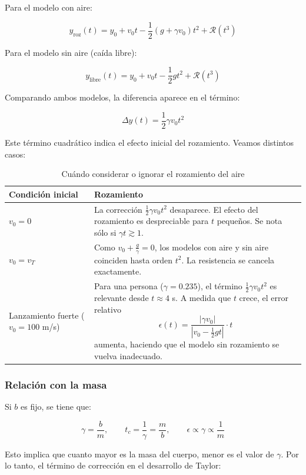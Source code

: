\documentclass{article}
\begin{document}
Para el modelo con aire:

\[
y_{\text{roz}}(t) = y_0 + v_0 t - \frac{1}{2}(g + \gamma v_0)t^2 + \mathcal{R}(t^3)
\]

Para el modelo sin aire (caída libre):

\[
y_{\text{libre}}(t) = y_0 + v_0 t - \frac{1}{2}gt^2 + \mathcal{R}(t^3)
\]

Comparando ambos modelos, la diferencia aparece en el término:

\[
\Delta y(t) = \frac{1}{2} \gamma v_0 t^2
\]

Este término cuadrático indica el efecto inicial del rozamiento. Veamos distintos casos:

\begin{table}[H]
\centering
\begin{tabular}{|l|p{10cm}|}
\hline
\textbf{Condición inicial} & \textbf{Rozamiento} \\
\hline
$v_0 = 0$ & La corrección $\frac{1}{2} \gamma v_0 t^2$ desaparece. El efecto del rozamiento es despreciable para $t$ pequeños. Se nota sólo si $\gamma t \gtrsim 1$. \\
\hline
$v_0 = v_T$ & Como $v_0 + \frac{g}{\gamma} = 0$, los modelos con aire y sin aire coinciden hasta orden $t^2$. La resistencia se cancela exactamente. \\
\hline
Lanzamiento fuerte ($v_0 = 100$ m/s) & Para una persona ($\gamma = 0.235$), el término $\frac{1}{2} \gamma v_0 t^2$ es relevante desde $t \approx 4$ s. 
A medida que $t$ crece, el error relativo 
\[
\epsilon(t) = \frac{|\gamma v_0|}{|v_0 - \frac{1}{2}gt|} \cdot t
\]
aumenta, haciendo que el modelo sin rozamiento se vuelva inadecuado. \\
\hline
\end{tabular}
\caption{Cuándo considerar o ignorar el rozamiento del aire}
\end{table}

\subsubsection*{Relación con la masa}

Si $b$ es fijo, se tiene que:

\[
\gamma = \frac{b}{m}, \qquad t_c = \frac{1}{\gamma} = \frac{m}{b}, \qquad \epsilon \propto \gamma \propto \frac{1}{m}
\]

Esto implica que cuanto mayor es la masa del cuerpo, menor es el valor de $\gamma$. Por lo tanto, el término de corrección en el desarrollo de Taylor:
\end{document}
